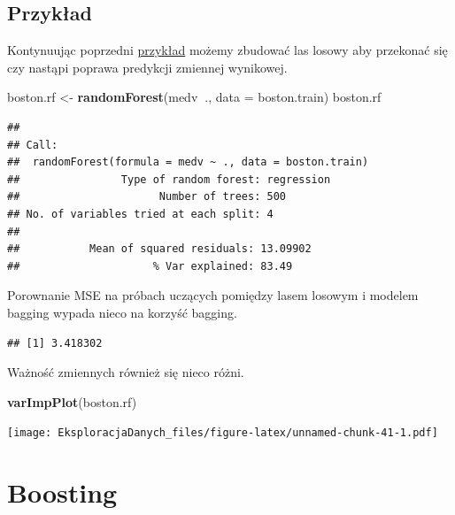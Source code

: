 \documentclass[]{book}
\newenvironment{Shaded}{\begin{snugshade}}{\end{snugshade}}
\newcommand{\DataTypeTok}[1]{\textcolor[rgb]{0.13,0.29,0.53}{#1}}
\newcommand{\KeywordTok}[1]{\textcolor[rgb]{0.13,0.29,0.53}{\textbf{#1}}}
\newcommand{\NormalTok}[1]{#1}
\newcommand{\OperatorTok}[1]{\textcolor[rgb]{0.81,0.36,0.00}{\textbf{#1}}}
\newcommand{\StringTok}[1]{\textcolor[rgb]{0.31,0.60,0.02}{#1}}
\theoremstyle{plain}
\theoremstyle{definition}
\begin{document}
\hypertarget{przyk52}{%
\subsection{Przykład}\label{przyk52}}

Kontynuując poprzedni \protect\hyperlink{przyk51}{przykład} możemy zbudować las losowy aby przekonać się czy nastąpi poprawa predykcji zmiennej wynikowej.

\begin{Shaded}
\begin{Highlighting}[]
\NormalTok{boston.rf <-}\StringTok{ }\KeywordTok{randomForest}\NormalTok{(medv}\OperatorTok{~}\NormalTok{., }\DataTypeTok{data =}\NormalTok{ boston.train)}
\NormalTok{boston.rf}
\end{Highlighting}
\end{Shaded}

\begin{verbatim}
## 
## Call:
##  randomForest(formula = medv ~ ., data = boston.train) 
##                Type of random forest: regression
##                      Number of trees: 500
## No. of variables tried at each split: 4
## 
##           Mean of squared residuals: 13.09902
##                     % Var explained: 83.49
\end{verbatim}

Porownanie MSE na próbach uczących pomiędzy lasem losowym i modelem bagging wypada nieco na korzyść bagging.

\begin{Shaded}
\end{Shaded}

\begin{verbatim}
## [1] 3.418302
\end{verbatim}

Ważność zmiennych również się nieco różni.

\begin{Shaded}
\begin{Highlighting}[]
\KeywordTok{varImpPlot}\NormalTok{(boston.rf)}
\end{Highlighting}
\end{Shaded}

\texttt{[image: EksploracjaDanych\_files/figure-latex/unnamed-chunk-41-1.pdf]}

\hypertarget{boosting}{%
\section{Boosting}\label{boosting}}


\end{document}
